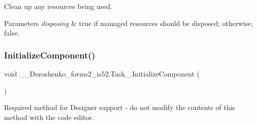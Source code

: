Clean up any resources being used. 


\begin{DoxyParams}{Parameters}
{\em disposing} & true if managed resources should be disposed; otherwise, false.\\
\hline
\end{DoxyParams}
\hypertarget{class__7___doroshenko__forms2__is52_1_1_task__9_aa49b500c1ab2cab10eb0e298c86bd3f7}{}\label{class__7___doroshenko__forms2__is52_1_1_task__9_aa49b500c1ab2cab10eb0e298c86bd3f7} 
\subsubsection{\texorpdfstring{Initialize\+Component()}{InitializeComponent()}}
{\footnotesize\ttfamily void \+\_\+\_\+\+Doroshenko\+\_\+forms2\+\_\+is52.\+Task\+\_.\+Initialize\+Component (\begin{DoxyParamCaption}{ }\end{DoxyParamCaption})\hspace{0.3cm}{\ttfamily [private]}}



Required method for Designer support -\/ do not modify the contents of this method with the code editor. 

